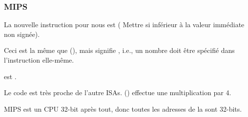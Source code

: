 \subsubsection{MIPS}




La nouvelle instruction pour nous est  (
Mettre si inférieur à la valeur immédiate non signée).

Ceci est la même que  (), mais  signifie
, i.e., un nombre doit être spécifié dans l'instruction elle-même.

 est .

Le code est très proche de l'autre \ac{ISA}s.
 () effectue une multiplication par 4.

MIPS est un CPU 32-bit après tout, donc toutes les adresses de la 
sont 32-bits.

